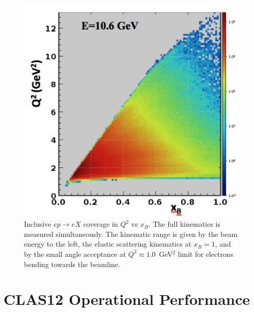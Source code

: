 \documentclass[final,3p,twocolumn]{elsarticle}
\begin{document}
\begin{figure}[htbp!]
\centerline{\includegraphics[width=1.0\columnwidth]{e-inclusive.png}}
\caption{Inclusive $ep \to eX$ coverage in $Q^2$ vs $x_B$. The full kinematics is measured simultaneously. The
kinematic range is given by the beam energy to the left, the elastic scattering kinematics at $x_B = 1$, and by the
small angle acceptance at $Q^2 \approx 1.0$~GeV$^2$ limit for electrons bending towards the beamline.} 
\label{electron-acceptance}
\end{figure}

\section{CLAS12 Operational Performance}
\end{document}

